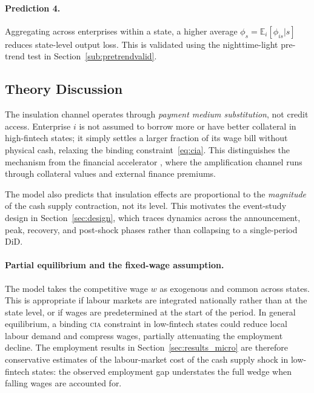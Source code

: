 \paragraph{Prediction 4.} Aggregating across enterprises within a state, a
higher average $\phi_s = \mathbb{E}_i[\phi_{is}|s]$ reduces state-level
output loss. This is validated using the nighttime-light pre-trend test in
Section~\ref{sub:pretrendvalid}.

\subsection{Theory Discussion}

The insulation channel operates through \emph{payment medium substitution},
not credit access. Enterprise $i$ is not assumed to borrow more or have
better collateral in high-fintech states; it simply settles a larger fraction
of its wage bill without physical cash, relaxing the binding
constraint~\eqref{eq:cia}. This distinguishes the mechanism from the
financial accelerator \citep{repec:eee:macchp:1-21}, where the amplification
channel runs through collateral values and external finance premiums.

The model also predicts that insulation effects are proportional to the
\emph{magnitude} of the cash supply contraction, not its level. This motivates
the event-study design in Section~\ref{sec:design}, which traces dynamics
across the announcement, peak, recovery, and post-shock phases rather than
collapsing to a single-period DiD.

\paragraph{Partial equilibrium and the fixed-wage assumption.}
The model takes the competitive wage $w$ as exogenous and common across
states. This is appropriate if labour markets are integrated nationally
rather than at the state level, or if wages are predetermined at the start
of the period. In general equilibrium, a binding \textsc{cia} constraint
in low-fintech states could reduce local labour demand and compress wages,
partially attenuating the employment decline. The employment results in
Section~\ref{sec:results_micro} are therefore conservative estimates of
the labour-market cost of the cash supply shock in low-fintech states:
the observed employment gap understates the full wedge when falling wages
are accounted for.
